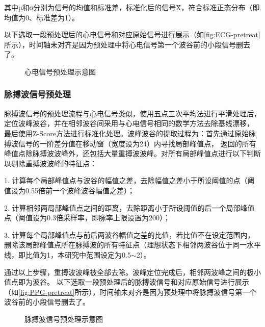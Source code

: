其中μ和σ分别为信号的均值和标准差，标准化后的信号\~X，符合标准正态分布（即均值为0、标准差为1）。

以下选取一段预处理后的心电信号和对应原始信号进行展示（如\autoref{fig:ECG-pretreat}所示），时间轴未对齐是因为预处理中将心电信号第一个波谷前的小段信号删去了。
\vspace{-1ex}
\begin{figure}[htbp]
    \caption[心电信号预处理示意图]{心电信号预处理示意图}
    \label{fig:ECG-pretreat}
\end{figure}

\subsubsection{脉搏波信号预处理}
脉搏波信号的预处理流程与心电信号类似，使用五点三次平均法进行平滑处理后，定位波峰波谷，并在相邻波谷间采用与心电信号相同的数学方法去除基线漂移，
最后使用Z-Score方法进行标准化处理。波峰波谷的提取过程为：首先通过原始脉搏波信号的一阶差分值在移动窗（宽度设为24）内寻找局部峰值点，
返回的所有峰值点除脉搏波波峰外，还包括大量重搏波波峰。对所有局部峰值点进行以下判断以剔除重搏波波峰的特征点：

1. 计算每个局部峰值点与波谷的幅值之差，去除幅值之差小于所设阈值的点（阈值设为0.55倍前一个波峰波谷幅值之差）；

2. 计算相邻两局部峰值点之间的距离，去除距离小于所设阈值的后一个局部峰值点（阈值设为0.3倍采样率，即脉率上限设置为200）；

3. 计算每个局部峰值点与前后两波谷幅值之差的比值，若比值不在设定范围内，删除该局部峰值点所在脉搏波的所有特征点（理想状态下相邻两波谷位于同一水平线，即比值为1，本研究中范围设定为0.5$ \sim $2）。

通过以上步骤，重搏波波峰被全部去除。波峰定位完成后，相邻两波峰之间的极小值点即为波谷。
以下选取一段预处理后的脉搏波信号和对应原始信号进行展示（如\autoref{fig:PPG-pretreat}所示），时间轴未对齐是因为预处理中将脉搏波信号第一个波谷前的小段信号删去了。
\vspace{-1ex}
\begin{figure}[htbp]
    \caption[脉搏波信号预处理示意图]{脉搏波信号预处理示意图}
    \label{fig:PPG-pretreat}
\end{figure}

